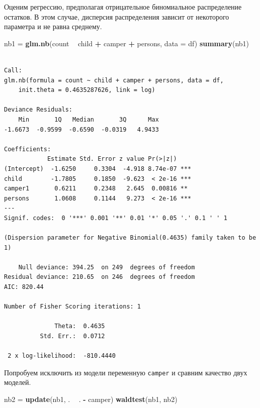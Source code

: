 \documentclass[]{book}
\newenvironment{Shaded}{\begin{snugshade}}{\end{snugshade}}
\newcommand{\DataTypeTok}[1]{\textcolor[rgb]{0.13,0.29,0.53}{#1}}
\newcommand{\KeywordTok}[1]{\textcolor[rgb]{0.13,0.29,0.53}{\textbf{#1}}}
\newcommand{\NormalTok}[1]{#1}
\newcommand{\OperatorTok}[1]{\textcolor[rgb]{0.81,0.36,0.00}{\textbf{#1}}}
\newcommand{\StringTok}[1]{\textcolor[rgb]{0.31,0.60,0.02}{#1}}
\begin{document}
Оценим регрессию, предполагая отрицательное биномиальное распределение остатков. В этом случае, дисперсия распределения зависит от некоторого параметра и не равна среднему.

\begin{Shaded}
\begin{Highlighting}[]
\NormalTok{nb1 =}\StringTok{ }\KeywordTok{glm.nb}\NormalTok{(count }\OperatorTok{~}\StringTok{ }\NormalTok{child }\OperatorTok{+}\StringTok{ }\NormalTok{camper }\OperatorTok{+}\StringTok{  }\NormalTok{persons, }\DataTypeTok{data =}\NormalTok{ df)}
\KeywordTok{summary}\NormalTok{(nb1)}
\end{Highlighting}
\end{Shaded}

\begin{verbatim}

Call:
glm.nb(formula = count ~ child + camper + persons, data = df, 
    init.theta = 0.4635287626, link = log)

Deviance Residuals: 
    Min       1Q   Median       3Q      Max  
-1.6673  -0.9599  -0.6590  -0.0319   4.9433  

Coefficients:
            Estimate Std. Error z value Pr(>|z|)    
(Intercept)  -1.6250     0.3304  -4.918 8.74e-07 ***
child        -1.7805     0.1850  -9.623  < 2e-16 ***
camper1       0.6211     0.2348   2.645  0.00816 ** 
persons       1.0608     0.1144   9.273  < 2e-16 ***
---
Signif. codes:  0 '***' 0.001 '**' 0.01 '*' 0.05 '.' 0.1 ' ' 1

(Dispersion parameter for Negative Binomial(0.4635) family taken to be 1)

    Null deviance: 394.25  on 249  degrees of freedom
Residual deviance: 210.65  on 246  degrees of freedom
AIC: 820.44

Number of Fisher Scoring iterations: 1

              Theta:  0.4635 
          Std. Err.:  0.0712 

 2 x log-likelihood:  -810.4440 
\end{verbatim}

Попробуем исключить из модели переменную \texttt{camper} и сравним качество двух моделей.

\begin{Shaded}
\begin{Highlighting}[]
\NormalTok{nb2 =}\StringTok{ }\KeywordTok{update}\NormalTok{(nb1, . }\OperatorTok{~}\StringTok{ }\NormalTok{. }\OperatorTok{-}\StringTok{ }\NormalTok{camper)}
\KeywordTok{waldtest}\NormalTok{(nb1, nb2)}
\end{Highlighting}
\end{Shaded}
\end{document}
